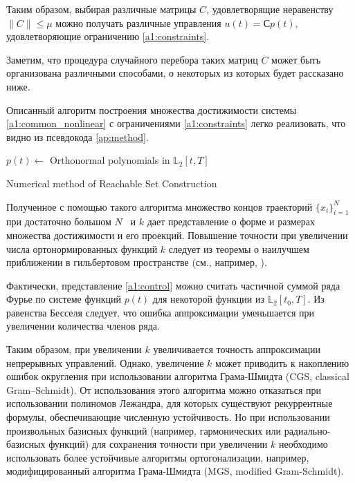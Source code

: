 \documentclass[../main.tex]{subfiles}
\begin{document}
  Таким образом, выбирая различные матрицы $C$, удовлетворящие неравенству $\| C\| \leqslant \mu $ можно получать различные управления $u(t) = С p(t)$, удовлетворяющие ограничению \eqref{a1:constraints}.
  
  Заметим, что процедура случайного перебора таких матриц $C$ может быть организована различными способами, о некоторых из которых будет рассказано ниже.
  
  Описанный алгоритм построения множества достижимости системы \eqref{a1:common_nonlinear} с ограничениями \eqref{a1:constraints} легко реализовать, что видно из псевдокода \ref{ap:method}.
  \begin{algorithm}[hbt!]
  	$p(t) \gets $ Orthonormal polynomials in $\mathbb{L}_2[t,T]$ \;
  	\caption{Numerical method of Reachable Set Construction}
  	 \label{ap:method}
  \end{algorithm}
  
  Полученное с помощью такого алгоритма множество концов траекторий $\{x_i\}_{i = 1}^{N}$ при достаточно большом $N$  и $k$ дает представление о форме и размерах множества достижимости и его проекций. 
  Повышение точности при увеличении числа ортонормированных функций $k$ следует из теоремы о наилучшем приближении в гильбертовом пространстве (см., например, \cite{Kolmogorov}). 
  
  Фактически, представление \eqref{a1:control} можно считать частичной суммой ряда Фурье по системе функций $p(t)$ для некоторой функции из $\mathbb{L}_2[t_0, {T}]$. 
  Из равенства Бесселя следует, что ошибка аппроксимации уменьшается при увеличении количества членов ряда. 
  
  Таким образом, при увеличении $k$ увеличивается точность аппроксимации непрерывных управлений. 
  Однако, увеличение $k$ может приводить к накоплению ошибок округления при использовании алгоритма Грама-Шмидта (CGS, classical Gram–Schmidt). 
  От использования этого алгоритма можно отказаться при использовании полиномов Лежандра, для которых существуют рекуррентные формулы, обеспечивающие численную устойчивость. 
  Но при использовании произвольных базисных функций (например, гармонических или радиально-базисных функций) для сохранения точности при увеличении $k$ необходимо использовать более устойчивые алгоритмы ортогонализации, например, модифицированный алгоритма  Грама-Шмидта (MGS, modified Gram-Schmidt).
  
\end{document}

